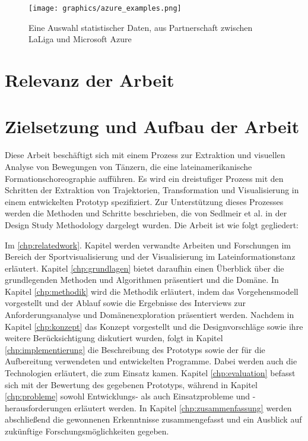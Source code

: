 \documentclass[
  ngerman,
  a4paper,  %
  twoside,  %
  bibliography=totoc,
  headsepline,
  cleardoublepage=empty,
  parskip=half,
  draft=false
]{scrbook}
\begin{document}
\begin{figure}
  \centering
  \texttt{[image: graphics/azure\_examples.png]}
  \caption{Eine Auswahl statistischer Daten, aus Partnerschaft zwischen LaLiga und Microsoft Azure \cite{microsoftazure}}
  \label{azure_examples}
\end{figure}
\section{Relevanz der Arbeit}
\section{Zielsetzung und Aufbau der Arbeit}
Diese Arbeit beschäftigt sich mit einem Prozess zur Extraktion und visuellen Analyse von Bewegungen von Tänzern, die eine lateinamerikanische Formationschoreographie aufführen. Es wird ein dreistufiger Prozess mit den Schritten der Extraktion von Trajektorien, Transformation und Visualisierung in einem entwickelten Prototyp  spezifiziert. Zur Unterstützung dieses Prozesses werden die Methoden und Schritte beschrieben, die von Sedlmeir et al. in der Design Study Methodology dargelegt wurden. Die Arbeit ist wie folgt gegliedert:

Im \ref{chp:relatedwork}. Kapitel werden verwandte Arbeiten und Forschungen im Bereich der Sportvisualisierung und der Visualisierung im Lateinformationstanz erläutert. Kapitel \ref{chp:grundlagen} bietet daraufhin einen Überblick über die grundlegenden Methoden und Algorithmen präsentiert und die Domäne.
In Kapitel \ref{chp:methodik} wird die Methodik erläutert, indem das Vorgehensmodell vorgestellt und der Ablauf sowie die Ergebnisse des Interviews zur Anforderungsanalyse und Domänenexploration präsentiert werden. Nachdem in Kapitel \ref{chp:konzept} das Konzept vorgestellt und die Designvorschläge sowie ihre weitere Berücksichtigung diskutiert wurden, folgt in Kapitel \ref{chp:implementierung} die Beschreibung des Prototyps sowie der für die Aufbereitung verwendeten und entwickelten Programme. Dabei werden auch die Technologien erläutert, die zum Einsatz kamen.
Kapitel \ref{chp:evaluation} befasst sich mit der Bewertung des gegebenen Prototyps, während in Kapitel \ref{chp:probleme} sowohl Entwicklungs- als auch Einsatzprobleme und -herausforderungen erläutert werden. In Kapitel \ref{chp:zusammenfassung} werden abschließend die gewonnenen Erkenntnisse zusammengefasst und ein Ausblick auf zukünftige Forschungsmöglichkeiten gegeben.
\end{document}
